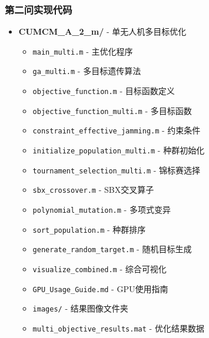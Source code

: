 \subsubsection{第二问实现代码}
\begin{itemize}
    \item \textbf{CUMCM\_A\_2\_m/} - 单无人机多目标优化
    \begin{itemize}
        \item \texttt{main\_multi.m} - 主优化程序
        \item \texttt{ga\_multi.m} - 多目标遗传算法
        \item \texttt{objective\_function.m} - 目标函数定义
        \item \texttt{objective\_function\_multi.m} - 多目标函数
        \item \texttt{constraint\_effective\_jamming.m} - 约束条件
        \item \texttt{initialize\_population\_multi.m} - 种群初始化
        \item \texttt{tournament\_selection\_multi.m} - 锦标赛选择
        \item \texttt{sbx\_crossover.m} - SBX交叉算子
        \item \texttt{polynomial\_mutation.m} - 多项式变异
        \item \texttt{sort\_population.m} - 种群排序
        \item \texttt{generate\_random\_target.m} - 随机目标生成
        \item \texttt{visualize\_combined.m} - 综合可视化
        \item \texttt{GPU\_Usage\_Guide.md} - GPU使用指南
        \item \texttt{images/} - 结果图像文件夹
        \item \texttt{multi\_objective\_results.mat} - 优化结果数据
    \end{itemize}
\end{itemize}

